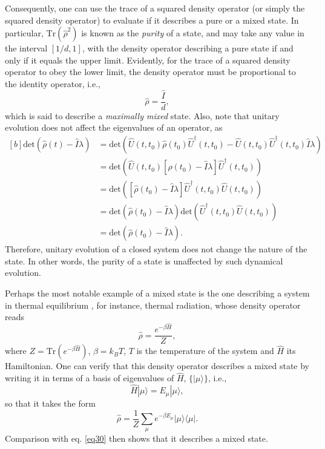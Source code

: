 \documentclass[
12pt,		%
openright,	%
twoside,  %
a4paper,			%
chapter=TITLE,		%
english,			%
french,				%
spanish,			%
brazil				%
]{USPSC-classe/USPSC}
\begin{document}
\begin{apendicesenv}
Consequently, one can use the trace of a squared density operator (or simply the squared density operator) to evaluate if it describes a pure or a mixed state. In particular, $\text{Tr}(\hat{\rho}^2)$ is known as the \textit{purity} of a state, and may take any value in the interval $[1/d,1]$, with the density operator describing a pure state if and only if it equals the upper limit. Evidently, for the trace of a squared density operator to obey the lower limit, the density operator must be proportional to the identity operator, i.e.,
\begin{equation}
    \hat{\rho}=\frac{\hat{I}}{d},
\end{equation}
which is said to describe a \textit{maximally mixed} state. Also, note that unitary evolution does not affect the eigenvalues of an operator, as
\begin{equation}\label{45}
    \begin{aligned}[b]
\text{det}(\hat{\rho}(t)-\hat{I}\lambda) & = \text{det}(\hat{U}(t,t_0)\hat{\rho}(t_0)\hat{U}^{\dagger}(t,t_0)-\hat{U}(t,t_0)\hat{U}^{\dagger}(t,t_0)\hat{I}\lambda)\\
& = \text{det}(\hat{U}(t,t_0)[\hat{\rho}(t_0)-\hat{I}\lambda]\hat{U}^{\dagger}(t,t_0))\\
& = \text{det}([\hat{\rho}(t_0)-\hat{I}\lambda]\hat{U}^{\dagger}(t,t_0)\hat{U}(t,t_0))\\
& = \text{det}(\hat{\rho}(t_0)-\hat{I}\lambda)\text{det}(\hat{U}^{\dagger}(t,t_0)\hat{U}(t,t_0))\\
& = \text{det}(\hat{\rho}(t_0)-\hat{I}\lambda).
    \end{aligned}
\end{equation}
Therefore, unitary evolution of a closed system does not change the nature of the state. In other words, the purity of a state is unaffected by such dynamical evolution.

Perhaps the most notable example of a mixed state is the one describing a system in thermal equilibrium \cite{Blum2012}, for instance, thermal radiation, whose density operator reads
\begin{equation}
    \hat{\rho}=\frac{e^{-\beta \hat{H}}}{Z},
\end{equation}
where $Z=\text{Tr}(e^{-\beta \hat{H}})$, $\beta=k_BT$, $T$ is the temperature of the system and $\hat{H}$ its Hamiltonian. One can verify that this density operator describes a mixed state by writing it in terms of a basis of eigenvalues of $\hat{H}$, $\{|\mu\rangle\}$, i.e.,
\begin{equation}
    \hat{H}|\mu\rangle=E_{\mu}|\mu\rangle,
\end{equation}
so that it takes the form
\begin{equation}
    \hat{\rho}=\frac{1}{Z}\sum_{\mu}e^{-\beta E_{\mu}}|\mu\rangle\langle\mu|.
\end{equation}
Comparison with eq. \ref{eq30} then shows that it describes a mixed state. 


\end{apendicesenv}
\end{document}
